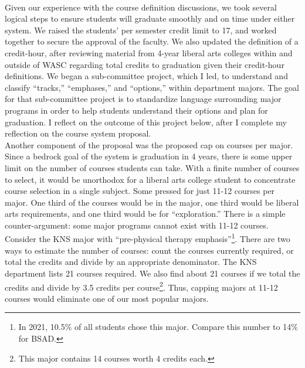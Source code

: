 \documentclass[../../../main.tex]{subfiles}
\begin{document}
\\
\vspace{0.25cm}
Given our experience with the course definition discussions, we took several logical steps to ensure students will graduate smoothly and on time under either system.  We raised the students' per semester credit limit to 17, and worked together to secure the approval of the faculty.  We also updated the definition of a credit-hour, after reviewing material from 4-year liberal arts colleges within and outside of WASC regarding total credits to graduation given their credit-hour definitions.  We began a sub-committee project, which I led, to understand and classify ``tracks,'' ``emphases,'' and ``options,'' within department majors.  The goal for that sub-committee project is to standardize language surrounding major programs in order to help students understand their options and plan for graduation.  I reflect on the outcome of this project below, after I complete my reflection on the course system proposal.
\\
\vspace{0.25cm}
Another component of the proposal was the proposed cap on courses per major.  Since a bedrock goal of the system is graduation in 4 years, there is some upper limit on the number of courses students can take.  With a finite number of courses to select, it would be unorthodox for a liberal arts college student to concentrate course selection in a single subject.  Some pressed for just 11-12 courses per major.  One third of the courses would be in the major, one third would be liberal arts requirements, and one third would be for ``exploration.''  There is a simple counter-argument: some major programs cannot exist with 11-12 courses.  Consider the KNS major with ``pre-physical therapy emphasis''\footnote{In 2021, 10.5\% of all students chose this major.  Compare this number to 14\% for BSAD.}.  There are two ways to estimate the number of courses: count the courses currently required, or total the credits and divide by an appropriate denominator.  The KNS department lists 21 courses required.  We also find about 21 courses if we total the credits and divide by 3.5 credits per course\footnote{This major contains 14 courses worth 4 credits each.}.  Thus, capping majors at 11-12 courses would eliminate one of our most popular majors.
\\
\vspace{0.25cm}
\end{document}
